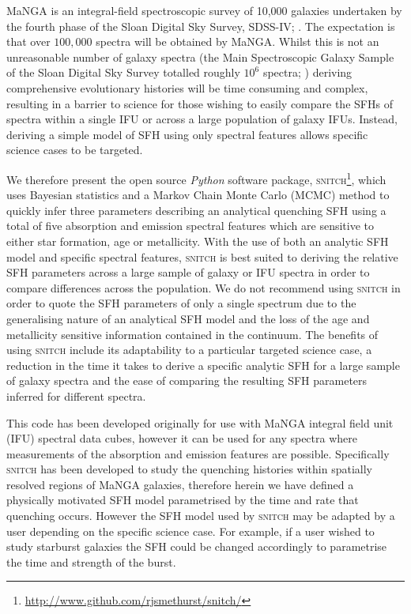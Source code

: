 \documentclass[useAMS,usenatbib]{mn2e}
\def\referee		{\color{refer}}
\begin{document}
MaNGA \citep{bundy15} is an integral-field spectroscopic survey of 10,000 galaxies undertaken by the fourth phase of the Sloan Digital Sky Survey, SDSS-IV; \cite{blanton17}. The expectation is that over $100,000$ spectra will be obtained by MaNGA. Whilst this is not an unreasonable number of galaxy spectra (the Main Spectroscopic Galaxy Sample of the Sloan Digital Sky Survey totalled roughly $10^6$ spectra; \citealt{strauss02}) {\referee deriving comprehensive evolutionary histories} will be time consuming and complex, resulting in a barrier to science for those wishing to easily compare the SFHs of spectra within a single IFU or across a large population of galaxy IFUs. Instead, deriving a simple model of SFH {\referee using only spectral features} allows specific science cases to be targeted. 

We therefore present the open source \emph{Python} software package, \textsc{snitch}\footnote{\url{http://www.github.com/rjsmethurst/snitch/}}, which uses Bayesian statistics and a Markov Chain Monte Carlo (MCMC) method to quickly infer three parameters describing an analytical quenching SFH using a total of five absorption and emission spectral features which are sensitive to either star formation, age or metallicity. {\referee With the use of both an analytic SFH model and specific spectral features}, \textsc{snitch} is best suited to deriving the relative SFH parameters across a large sample of galaxy or IFU spectra in order to compare differences across the population. We do not recommend using \textsc{snitch} in order to quote the SFH parameters of only a single spectrum due to the generalising nature of an analytical SFH model {\referee and the loss of the age and metallicity sensitive information contained in the continuum.}  The benefits of using \textsc{snitch} include its adaptability to a particular targeted science case, a reduction in the time it takes to derive a specific analytic SFH for a large sample of galaxy spectra and the ease of comparing the resulting SFH parameters inferred for different spectra. 

This code has been developed originally for use with MaNGA integral field unit (IFU) spectral data cubes, however it can be used for any spectra where measurements of the absorption and emission features are possible. Specifically \textsc{snitch} has been developed to study the quenching histories within spatially resolved regions of MaNGA galaxies, therefore herein we have defined a physically motivated SFH model parametrised by the time and rate that quenching occurs. However the SFH model used by \textsc{snitch} may be adapted by a user depending on the specific science case. For example, if a user wished to study starburst galaxies the SFH could be changed accordingly to parametrise the time and strength of the burst. 
\end{document}
